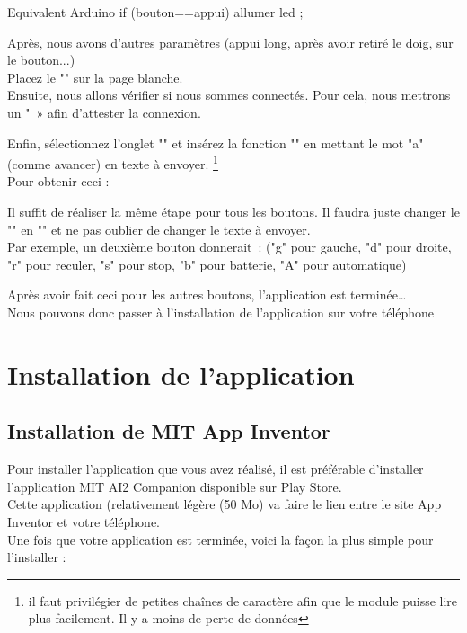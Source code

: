 \begin{Cpp}{Equivalent Arduino}
if (bouton==appui) {allumer led ;}     
\end{Cpp}
	        
Après, nous avons d'autres  paramètres (appui long, après avoir retiré le doig, sur le bouton...) \\


Placez le "" sur la page blanche. \\

Ensuite, nous allons vérifier si nous sommes connectés. Pour cela, nous mettrons un " » afin d’attester la connexion.

Enfin, sélectionnez l'onglet "" et insérez la fonction "" en mettant le mot "a" (comme avancer) en texte à envoyer. \footnote{il faut privilégier de petites chaînes de caractère afin que le module puisse lire plus facilement. Il y a moins de perte de données} \\
Pour obtenir ceci : 



Il suffit de réaliser la même étape pour tous les boutons. Il faudra juste changer le "" en "" et ne pas oublier de changer le texte à envoyer. \\


Par exemple, un deuxième bouton donnerait :  ("g" pour gauche, "d" pour droite, "r" pour reculer, "s" pour stop, "b" pour batterie, "A" pour automatique)


Après avoir fait ceci pour les autres boutons, l'application est terminée… \\
Nous pouvons donc passer à l'installation de l'application sur votre téléphone\chapter{Installation de l'application}

\section{Installation de MIT App Inventor}

Pour installer l'application que vous avez réalisé, il est préférable d'installer l'application MIT AI2 Companion disponible sur Play Store. \\
Cette application (relativement légère (50 Mo) va faire le lien entre le site App Inventor et votre téléphone. \\
Une fois que votre application est terminée, voici la façon la plus simple pour l'installer : 


